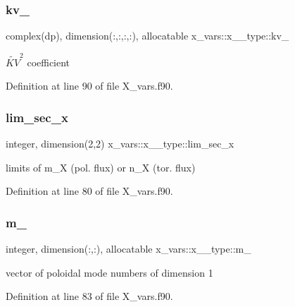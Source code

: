 \subsubsection{\texorpdfstring{kv\+\_}{kv\_2}}
{\footnotesize\ttfamily complex(dp), dimension(\+:,\+:,\+:,\+:), allocatable x\+\_\+vars\+::x\+\_\+\_\+type\+::kv\+\_}



$\widetilde{KV}^2$ coefficient 



Definition at line 90 of file X\+\_\+vars.\+f90.

\mbox{\label{structx__vars_1_1x__2__type_aac1744d056531f6fe7f7426dd4fcd92b}} 
\subsubsection{\texorpdfstring{lim\+\_\+sec\+\_\+x}{lim\_sec\_x}}
{\footnotesize\ttfamily integer, dimension(2,2) x\+\_\+vars\+::x\+\_\+\_\+type\+::lim\+\_\+sec\+\_\+x}



limits of {\ttfamily m\+\_\+X} (pol. flux) or {\ttfamily n\+\_\+X} (tor. flux) 



Definition at line 80 of file X\+\_\+vars.\+f90.

\mbox{\label{structx__vars_1_1x__2__type_a024dedf39f2364d4593fe1bc0c195b10}} 
\subsubsection{\texorpdfstring{m\+\_}{m\_1}}
{\footnotesize\ttfamily integer, dimension(\+:,\+:), allocatable x\+\_\+vars\+::x\+\_\+\_\+type\+::m\+\_}



vector of poloidal mode numbers of dimension 1 



Definition at line 83 of file X\+\_\+vars.\+f90.

